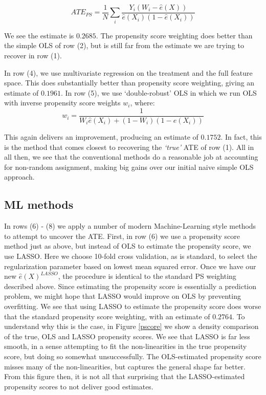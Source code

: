 \documentclass[paper=letter, fontsize=11pt]{scrartcl} %
\begin{document}
\[\widehat{ATE}_{PS} = \frac{1}{N}\sum_i \frac{ Y_i(W_i-\hat{e}(X))}{\hat{e}(X_i)(1-\hat{e}(X_i)) }\]

We see the estimate is $0.2685$. The propensity score weighting does better than the simple OLS of row (2), but is still far from the estimate we are trying to recover in row (1).

In row (4), we use multivariate regression on the treatment and the full feature space. This does substantially better than propensity score weighting, giving an estimate of $0.1961$. In row (5), we use `double-robust' OLS in which we run OLS with inverse propensity score weights $w_i$, where:
\[w_i = \frac{1}{W_i\hat{e}(X_i) + (1-W_i)(1-\hat{e}(X_i))}\]

This again delivers an improvement, producing an estimate of $0.1752$. In fact, this is the method that comes closest to recovering the \textit{`true'} ATE of row (1). All in all then, we see that the conventional methods do a reasonable job at accounting for non-random assignment, making big gains over our initial naive simple OLS approach.

\subsection{ML methods}

In rows (6) - (8) we apply a number of modern Machine-Learning style methods to attempt to uncover the ATE. First, in row (6) we use a propensity score method just as above, but instead of OLS to estimate the propensity score, we use LASSO. Here we choose 10-fold cross validation, as is standard, to select the regularization parameter based on lowest mean squared error. Once we have our new $\hat{e}(X)^{LASSO}$, the procedure is identical to the standard PS weighting described above. Since estimating the propensity score is essentially a prediction problem, we might hope that LASSO would improve on OLS by preventing overfitting. We see that using LASSO to estimate the propensity score does worse that the standard propensity score weighting, with an estimate of $0.2764$. To understand why this is the case, in Figure \ref{pscore} we show a density comparison of the true, OLS and LASSO propensity scores. We see that LASSO is far less smooth, in a sense attempting to fit the non-linearities in the true propensity score, but doing so somewhat unsuccessfully. The OLS-estimated propensity score misses many of the non-linearities, but captures the general shape far better. From this figure then, it is not all that surprising that the LASSO-estimated propensity scores to not deliver good estimates.
\end{document}
